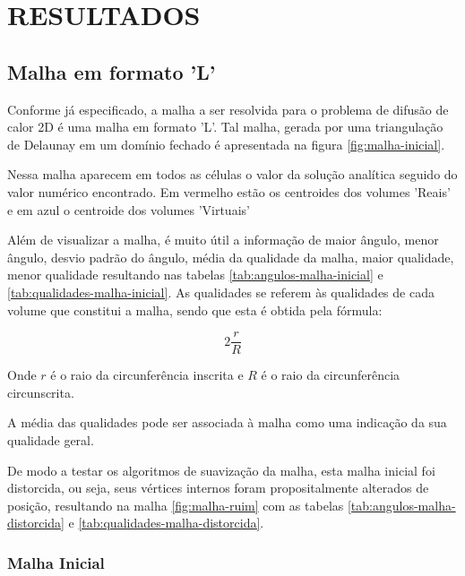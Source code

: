 \chapter[RESULTADOS]{RESULTADOS}

\section{Malha em formato 'L'}
Conforme já especificado, a malha a ser resolvida para o problema de difusão de calor 2D é uma malha em formato 'L'. Tal malha, gerada por uma triangulação de Delaunay em um domínio fechado é apresentada na figura \ref{fig:malha-inicial}.

Nessa malha aparecem em todos as células o valor da solução analítica seguido do valor numérico encontrado. Em vermelho estão os centroides dos volumes 'Reais' e em azul o centroide dos volumes 'Virtuais'

Além de visualizar a malha, é muito útil a informação de maior ângulo, menor ângulo, desvio padrão do ângulo, média da qualidade da malha, maior qualidade, menor qualidade resultando nas tabelas \ref{tab:angulos-malha-inicial} e \ref{tab:qualidades-malha-inicial}. As qualidades se referem às qualidades de cada volume que constitui a malha, sendo que esta é obtida pela fórmula:

\begin{equation}
    2 \frac{r}{R}
\end{equation}

Onde $r$ é o raio da circunferência inscrita e $R$ é o raio da circunferência circunscrita.

A média das qualidades pode ser associada à malha como uma indicação da sua qualidade geral.

De modo a testar os algoritmos de suavização da malha, esta malha inicial foi distorcida, ou seja, seus vértices internos foram propositalmente alterados de posição, resultando na malha \ref{fig:malha-ruim} com as tabelas \ref{tab:angulos-malha-distorcida} e \ref{tab:qualidades-malha-distorcida}.

\newpage
\subsection{Malha Inicial}

